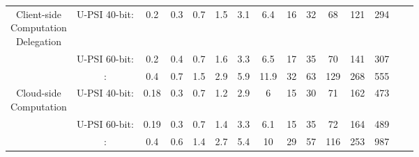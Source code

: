 \begin{table*}[!htbp]
\begin{footnotesize}
\begin{center}
\begin{tabular}{|c|c|c|c|c|c|c|c|c|c|c|c|c|c|c}
    \hline
\NameEntry{\center \scriptsize Client-side \\ \scriptsize Computation \\ \scriptsize  Delegation}
    \multirow{3}{*}%
    &\cellcolor{white!20} \scriptsize U-PSI 40-bit: &\cellcolor{white!20}  0.2  &\cellcolor{white!20}  0.3 &\cellcolor{white!20}  0.7 &\cellcolor{white!20} 1.5  &\cellcolor{white!20}  3.1 &\cellcolor{white!20}  6.4 &\cellcolor{white!20}  16 &\cellcolor{white!20}  32  &\cellcolor{white!20} 68  &\cellcolor{white!20}  121 &\cellcolor{white!20}  294  \\
    \cline{2-13}
    &\cellcolor{cyan!20}\scriptsize U-PSI 60-bit:&\cellcolor{cyan!20}  0.2&\cellcolor{cyan!20}0.4  &\cellcolor{cyan!20}0.7 &\cellcolor{cyan!20}  1.6  & \cellcolor{cyan!20}  3.3 &\cellcolor{cyan!20} 6.5  &\cellcolor{cyan!20}17 &\cellcolor{cyan!20}35 & \cellcolor{cyan!20}70  &\cellcolor{cyan!20} 141 &\cellcolor{cyan!20} 307  \\ 
    \cline{2-13}
    &\cellcolor{white!20}\scriptsize \cite{eopsi}: &\cellcolor{white!20}  0.4  &\cellcolor{white!20}  0.7 &\cellcolor{white!20} 1.5  &\cellcolor{white!20}   2.9&\cellcolor{white!20} 5.9 &\cellcolor{white!20} 11.9  &\cellcolor{white!20}  32 &\cellcolor{white!20}   63&\cellcolor{white!20} 129&\cellcolor{white!20} 268 &\cellcolor{white!20} 555 \\ 

    \hline


    \hline
\NameEntry{\center \scriptsize Cloud-side \\ \scriptsize  Computation}
    \multirow{3}{*}%
    &\cellcolor{cyan!20}\scriptsize U-PSI 40-bit:  &\cellcolor{cyan!20} 0.18 &\cellcolor{cyan!20}0.3  &\cellcolor{cyan!20} 0.7  &\cellcolor{cyan!20}1.2  &\cellcolor{cyan!20}2.9  &\cellcolor{cyan!20}6 &\cellcolor{cyan!20}15 &\cellcolor{cyan!20} 30 & \cellcolor{cyan!20}71 &\cellcolor{cyan!20} 162&\cellcolor{cyan!20}473 \\
    \cline{2-13}
    &\cellcolor{white!20} \scriptsize U-PSI 60-bit: &\cellcolor{white!20} 0.19 &\cellcolor{white!20}  0.3  &\cellcolor{white!20} 0.7 &\cellcolor{white!20} 1.4  &\cellcolor{white!20} 3.3 &\cellcolor{white!20}  6.1 &\cellcolor{white!20}  15 &\cellcolor{white!20}  35 &\cellcolor{white!20}  72&\cellcolor{white!20}  164 &\cellcolor{white!20}  489 \\ 
    \cline{2-13}
    &\cellcolor{cyan!20}\scriptsize \cite{eopsi}: &\cellcolor{cyan!20} 0.4  &\cellcolor{cyan!20} 0.6 &\cellcolor{cyan!20} 1.4 &\cellcolor{cyan!20}  2.7&\cellcolor{cyan!20}5.4 & \cellcolor{cyan!20}10  &\cellcolor{cyan!20} 29&\cellcolor{cyan!20}57 &\cellcolor{cyan!20} 116 & \cellcolor{cyan!20}253&\cellcolor{cyan!20} 987  \\ 
       \hline



\end{tabular}
\end{center}
\end{footnotesize}
\end{table*}
